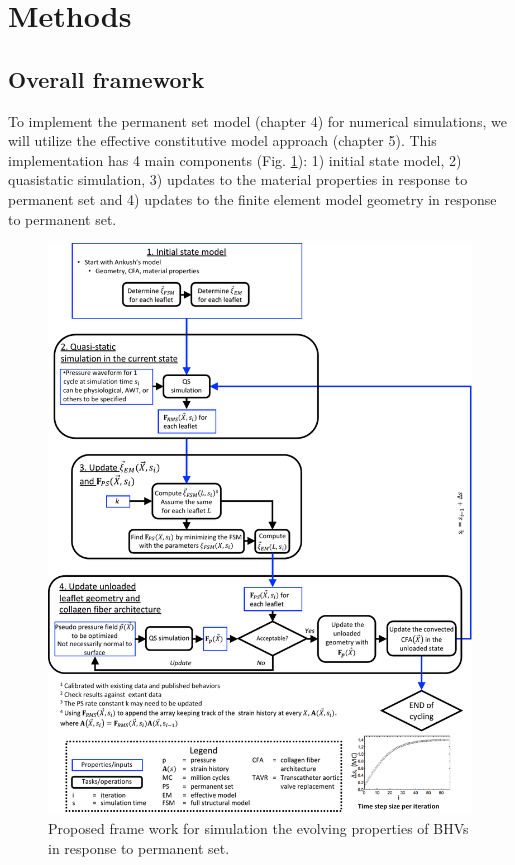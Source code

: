 \section{Methods}

\subsection{Overall framework}

    To implement the permanent set model (chapter 4) for numerical simulations, we will utilize the effective constitutive model approach (chapter 5). This implementation has 4 main components (Fig. \ref{c6:fig:pssimoverview}): 1) initial state model, 2) quasistatic simulation, 3) updates to the material properties in response to permanent set and 4) updates to the finite element model geometry in response to permanent set. 
    
    
\begin{figure}
\centering
\includegraphics[width=5.5in]{Images/chapter6/pssimoverview.pdf}
\caption{Proposed frame work for simulation the evolving properties of BHVs in response to permanent set.}
\label{c6:fig:pssimoverview}
\end{figure}


